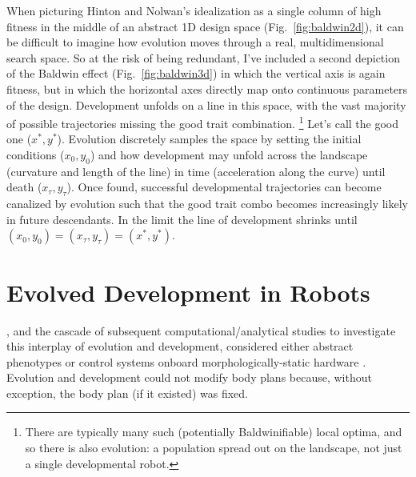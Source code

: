 When picturing Hinton and Nolwan's idealization as a single column of high fitness in the middle of an abstract 1D design space (Fig.~\ref{fig:baldwin2d}), it can be difficult to imagine how evolution moves through a real, multidimensional search space. 
So at the risk of being redundant, 
I've included a second depiction of the Baldwin effect (Fig.~\ref{fig:baldwin3d}) in which the vertical axis is again fitness, but in which the horizontal axes directly map onto continuous parameters of the design.
Development unfolds on a line in this space, with the vast majority of possible trajectories missing the good trait combination.%
\footnote{%
There are typically many such (potentially Baldwinifiable) local optima, and so there is also evolution: a population spread out on the landscape, not just a single developmental robot.%
} 
Let's call the good one ($x^*,y^*$).
Evolution discretely samples the space by setting the initial conditions ($x_0,y_0$) and how development may unfold across the landscape (curvature and length of the line) in time (acceleration along the curve) until death ($x_{\tau},y_{\tau}$).
Once found, successful developmental trajectories can become canalized by evolution such that the good trait combo becomes increasingly likely in future descendants.
In the limit the line of development shrinks until $(x_0,y_0) = (x_{\tau},y_{\tau}) = (x^*,y^*)$.




\section{Evolved Development in Robots}


\citet{hinton1987learning}, and the cascade of subsequent computational/analytical studies to investigate this interplay of evolution and development,
considered either abstract phenotypes \cite{belew1989evolution,ackley1991interactions,nolfi1994learning,french1994genes,mayley1996landscapes,ancel1999quantitative,ancel2000undermining,sendhoff1999model,suzuki2004interactions,downing2004development,santos2015phenotypic,fernando2018meta,todd2020interaction}
or control systems onboard morphologically-static hardware \cite{floreano1996plastic,husbands1998better}.
Evolution and development could not modify body plans because, without exception, the body plan (if it existed) was fixed.

